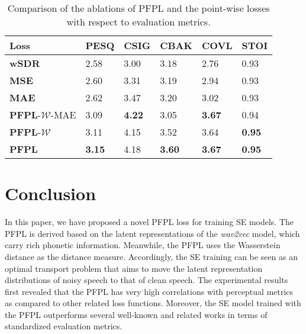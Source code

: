 \documentclass[a4paper]{article}
\begin{document}
\begin{table}[t]
\caption{Comparison of the ablations of PFPL and the point-wise losses with respect to evaluation metrics.}
\centering
\small
\begin{tabular*}{\linewidth}{l|P{7.2mm} P{7.2mm} P{7.2mm} P{7.2mm} P{7.2mm}}
\hline
Loss & PESQ & CSIG & CBAK & COVL & STOI\\
\hline
\hline
\textbf{wSDR \cite{choi2018phase}} & 2.58 & 3.00 & 3.18 & 2.76 & 0.93\\
\textbf{MSE} & 2.60 & 3.31 & 3.19 & 2.94 & 0.93\\
\textbf{MAE} & 2.62 & 3.47 & 3.20 & 3.02 & 0.93\\
\hline
\hline
\textbf{PFPL}-$\mathcal{W}$-MAE & 3.09 & \textbf{4.22} & 3.05 & \textbf{3.67} & 0.94\\
\textbf{PFPL}-$\mathcal{W}$ & 3.11 & 4.15 & 3.52 & 3.64 & \textbf{0.95}\\
\textbf{PFPL}& \textbf{3.15} & 4.18 & \textbf{3.60} & \textbf{3.67} & \textbf{0.95}\\
\hline
\end{tabular*}
\label{tab:losses}
\end{table}


\section{Conclusion}
\label{sec:conclusion}
In this paper, we have proposed a novel PFPL loss for training SE models. The PFPL is derived based on the latent representations of the {\it wav2vec} model, which carry rich phonetic information. Meanwhile, the PFPL uses the Wasserstein distance as the distance measure. Accordingly, the SE training can be seen as an optimal transport problem that aims to move the latent representation distributions of noisy speech to that of clean speech. The experimental results first revealed that the PFPL has very high correlations with perceptual metrics as  compared to other related loss functions. Moreover, the SE model trained with the PFPL outperforms several well-known and related works in terms of standardized evaluation metrics. 
\vfill\pagebreak




\end{document}
